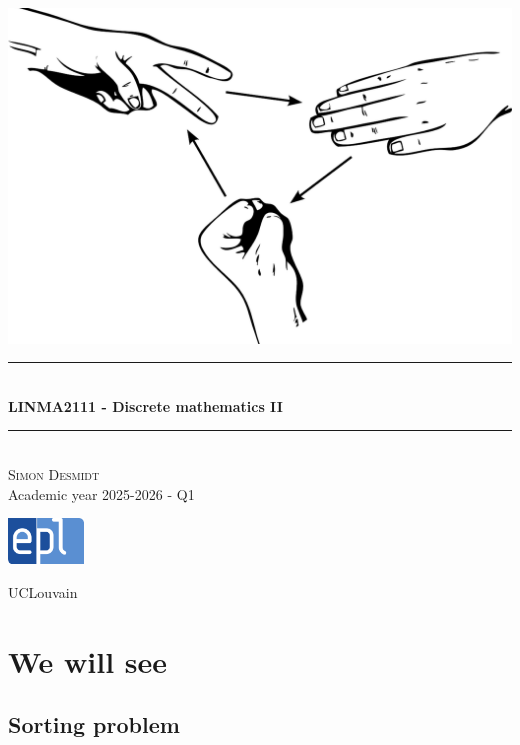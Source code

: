\documentclass[12pt, openany]{report}
\newcommand{\HRule}{\rule{\linewidth}{0.5mm}}
\theoremstyle{definition}
\begin{document}
\begin{titlepage}
    \begin{sffamily}
    \begin{center}
        \includegraphics[scale=0.25]{img/page_de_garde.png} \\[1cm]
        \HRule \\[0.4cm]
        { \huge \bfseries LINMA2111 - Discrete mathematics II \\[0.4cm] }
    
        \HRule \\[1.5cm]
        \textsc{\LARGE Simon Desmidt}\\[1cm]
        \vfill
        \vspace{2cm}
        {\large Academic year 2025-2026 - Q1}
        \vspace{0.4cm}
         
        \includegraphics[width=0.15\textwidth]{img/epl.png}
        
        UCLouvain\\
    
    \end{center}
    \end{sffamily}
\end{titlepage}

\setcounter{tocdepth}{1}
\tableofcontents
\chapter{We will see}
\section{Sorting problem}
\end{document}
